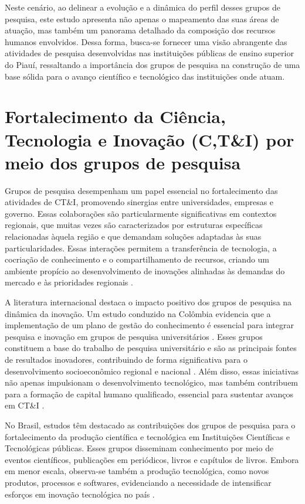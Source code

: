 \documentclass[portuguese]{textolivre}
\begin{document}
Neste cenário, ao delinear a evolução e a dinâmica do perfil desses grupos de pesquisa, este estudo apresenta não apenas o mapeamento das suas áreas de atuação, mas também um panorama detalhado da composição dos recursos humanos envolvidos. Dessa forma, busca-se fornecer uma visão abrangente das atividades de pesquisa desenvolvidas nas instituições públicas de ensino superior do Piauí, ressaltando a importância dos grupos de pesquisa na construção de uma base sólida para o avanço científico e tecnológico das instituições onde atuam.

\section{Fortalecimento da Ciência, Tecnologia e Inovação (C,T\&I) por meio dos grupos de pesquisa}
Grupos de pesquisa desempenham um papel essencial no fortalecimento das atividades de CT\&I, promovendo sinergias entre universidades, empresas e governo. Essas colaborações são particularmente significativas em contextos regionais, que muitas vezes são caracterizados por estruturas específicas relacionadas àquela região e que demandam soluções adaptadas às suas particularidades. Essas interações permitem a transferência de tecnologia, a cocriação de conhecimento e o compartilhamento de recursos, criando um ambiente propício ao desenvolvimento de inovações alinhadas às demandas do mercado e às prioridades regionais \cite{florencio2018}. 

A literatura internacional destaca o impacto positivo dos grupos de pesquisa na dinâmica da inovação. Um estudo conduzido na Colômbia evidencia que a implementação de um plano de gestão do conhecimento é essencial para integrar pesquisa e inovação em grupos de pesquisa universitários \cite{paezlogreira2016}. Esses grupos constituem a base do trabalho de pesquisa universitário e são as principais fontes de resultados inovadores, contribuindo de forma significativa para o desenvolvimento socioeconômico regional e nacional \cite{cabeza-pulles2018}. Além disso, essas iniciativas não apenas impulsionam o desenvolvimento tecnológico, mas também contribuem para a formação de capital humano qualificado, essencial para sustentar avanços em CT\&I \cite{munoz2024}.

No Brasil, estudos têm destacado as contribuições dos grupos de pesquisa para o fortalecimento da produção científica e tecnológica em Instituições Científicas e Tecnológicas públicas. Esses grupos disseminam conhecimento por meio de eventos científicos, publicações em periódicos, livros e capítulos de livros. Embora em menor escala, observa-se também a produção tecnológica, como novos produtos, processos e softwares, evidenciando a necessidade de intensificar esforços em inovação tecnológica no país \cite{lino2010,perucchi2011}.
\end{document}
